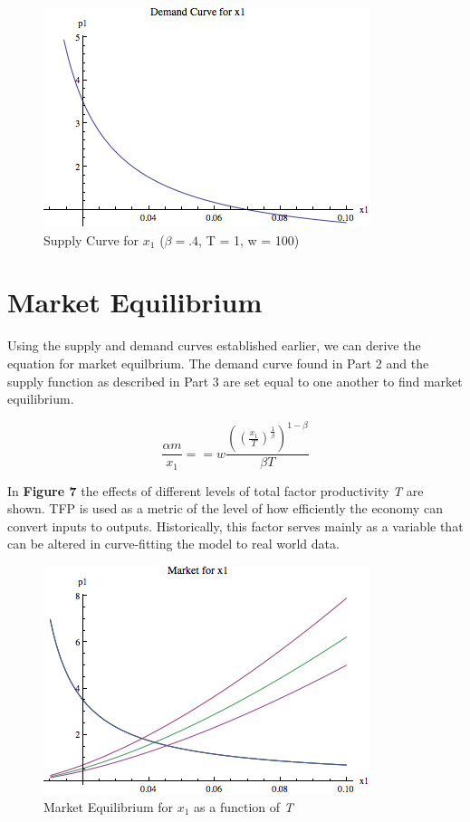 \documentclass{article}
\begin{document}
\begin{figure}[!ht]
	\begin{center}
	\includegraphics[scale=.75]{Figures/Supply}
	\caption{Supply Curve for $x_{1}$  ($\beta = .4$, T = 1, w = 100)}
	\end{center}
\end{figure}

\newpage

\section{Market Equilibrium}
Using the supply and demand curves established earlier, we can derive the equation for market equilbrium. The demand curve found in Part 2 and the supply function as described in Part 3 are set equal to one another to find market equilibrium. 

\begin{equation}
	\frac{\alpha m}{x_{1}} == w \frac{((\frac{x_{1}}{T})^{\frac{1}{\beta}})^{1-\beta}}{\beta T}
\end{equation}

In {\bf Figure 7} the effects of different levels of total factor productivity \emph{T} are shown. TFP is used as a metric of the level of how efficiently the economy can convert inputs to outputs. Historically, this factor serves mainly as a variable that can be altered in curve-fitting the model to real world data.

 \begin{figure}[!ht]
	\begin{center}
	\includegraphics[scale=.75]{Figures/MarketEquilT}
	\caption{Market Equilibrium for $x_{1}$ as a function of \emph{T}}
	\end{center}
\end{figure}
\end{document}
